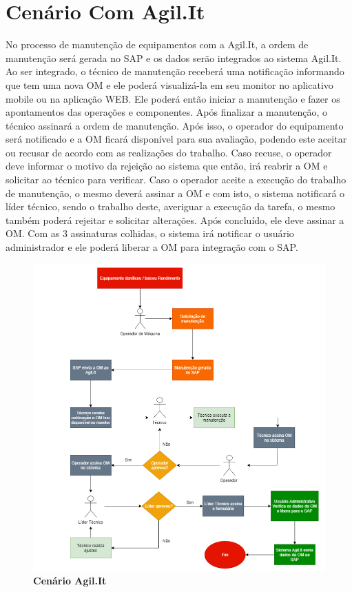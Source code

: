 \section{Cenário Com Agil.It}
No processo de manutenção de equipamentos com a Agil.It, a ordem de manutenção será gerada no SAP e os dados serão integrados ao sistema Agil.It. Ao ser integrado, o técnico de manutenção receberá uma notificação informando que tem uma nova OM e ele poderá visualizá-la em seu monitor no aplicativo mobile ou na aplicação WEB. Ele poderá então iniciar a manutenção e fazer os apontamentos das operações e componentes. Após finalizar a manutenção, o técnico assinará a ordem de manutenção. Após isso, o operador do equipamento será notificado e a OM ficará disponível para sua avaliação, podendo este aceitar ou recusar de acordo com as realizações do trabalho. Caso recuse, o operador deve informar o motivo da rejeição ao sistema que então, irá reabrir a OM e solicitar ao técnico para verificar. Caso o operador aceite a execução do trabalho de manutenção, o mesmo deverá assinar a OM e com isto, o sistema notificará o líder técnico, sendo o trabalho deste, averiguar a execução da tarefa, o mesmo também poderá rejeitar e solicitar alterações. Após concluído, ele deve assinar a OM. Com as 3 assinaturas colhidas, o sistema irá notificar o usuário administrador e ele poderá liberar a OM para integração com o SAP.
\newpage
\begin{figure}[htb]
	\caption{\textbf{\label{figure:cenario_agilit1}Cenário Agil.It}}
	\begin{center}
		\includegraphics[scale=0.52]{./Figuras/cenario-agilit1.png}
	\end{center}
\end{figure}
